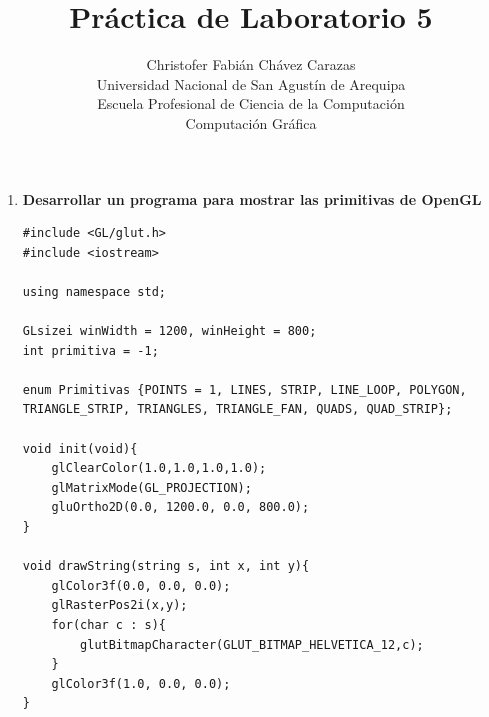 \documentclass[a4paper,12pt]{article}
\begin{document}
\title{Práctica de Laboratorio 5}
\author{
Christofer Fabián Chávez Carazas \\
\small{Universidad Nacional de San Agustín de Arequipa} \\
\small{Escuela Profesional de Ciencia de la Computación} \\
\small{Computación Gráfica}
}
\date{}

\maketitle

\begin{enumerate}
 \item \textbf{Desarrollar un programa para mostrar las primitivas de OpenGL}
 
 \begin{lstlisting}
#include <GL/glut.h>
#include <iostream>

using namespace std;

GLsizei winWidth = 1200, winHeight = 800;
int primitiva = -1;

enum Primitivas {POINTS = 1, LINES, STRIP, LINE_LOOP, POLYGON, TRIANGLE_STRIP, TRIANGLES, TRIANGLE_FAN, QUADS, QUAD_STRIP};

void init(void){
    glClearColor(1.0,1.0,1.0,1.0);
    glMatrixMode(GL_PROJECTION);
    gluOrtho2D(0.0, 1200.0, 0.0, 800.0);
}

void drawString(string s, int x, int y){
	glColor3f(0.0, 0.0, 0.0);
	glRasterPos2i(x,y);
	for(char c : s){
		glutBitmapCharacter(GLUT_BITMAP_HELVETICA_12,c);
	}
	glColor3f(1.0, 0.0, 0.0);
}


\end{lstlisting}
\end{enumerate}
\end{document}

